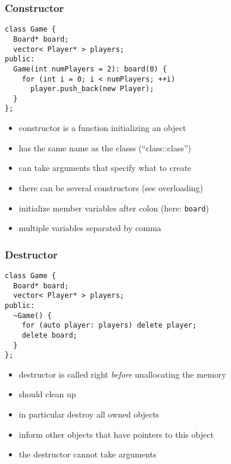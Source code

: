 \documentclass{slides}
\begin{document}
\begin{frame}[fragile]
  \frametitle{Constructor}

\begin{lstlisting}
class Game {
  Board* board;
  vector< Player* > players;
public:
  Game(int numPlayers = 2): board(0) {
    for (int i = 0; i < numPlayers; ++i)
      player.push_back(new Player);
  }
};
\end{lstlisting}

  \begin{itemize}
  \item constructor is a function initializing an object
  \item has the same name as the classs (``class::class'')
  \item can take arguments that specify what to create
  \item there can be several constructors (see overloading)
  \item initialize member variables after colon (here: \lstinline!board!)
  \item multiple variables separated by comma
  \end{itemize}
\end{frame}

\begin{frame}[fragile]
  \frametitle{Destructor}

\begin{lstlisting}
class Game {
  Board* board;
  vector< Player* > players;
public:
  ~Game() {
    for (auto player: players) delete player;
    delete board;
  }
};
\end{lstlisting}

  \begin{itemize}
  \item destructor is called right \emph{before} unallocating the
    memory
  \item should clean up
  \item in particular destroy all owned objects
  \item inform other objects that have pointers to this object
  \item the destructor cannot take arguments
  \end{itemize}
\end{frame}
\end{document}
